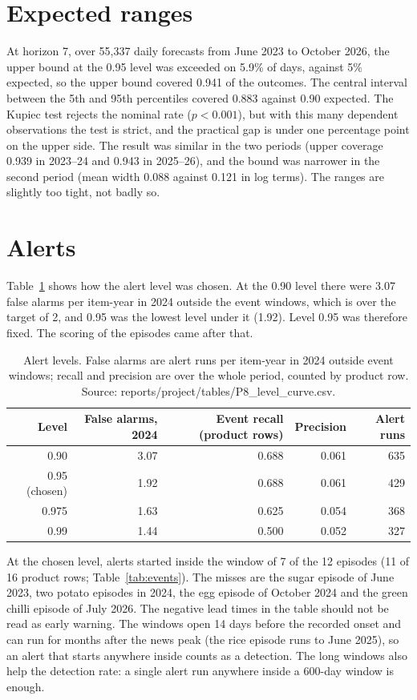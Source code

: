 \documentclass[12pt]{report}
\begin{document}
\section{Expected ranges}
At horizon 7, over 55,337 daily forecasts from June 2023 to October 2026, the upper bound at the 0.95 level was exceeded on 5.9\% of days, against 5\% expected, so the upper bound covered 0.941 of the outcomes. The central interval between the 5th and 95th percentiles covered 0.883 against 0.90 expected. The Kupiec test rejects the nominal rate ($p<0.001$), but with this many dependent observations the test is strict, and the practical gap is under one percentage point on the upper side. The result was similar in the two periods (upper coverage 0.939 in 2023--24 and 0.943 in 2025--26), and the bound was narrower in the second period (mean width 0.088 against 0.121 in log terms). The ranges are slightly too tight, not badly so.

\section{Alerts}
Table~\ref{tab:level} shows how the alert level was chosen. At the 0.90 level there were 3.07 false alarms per item-year in 2024 outside the event windows, which is over the target of 2, and 0.95 was the lowest level under it (1.92). Level 0.95 was therefore fixed. The scoring of the episodes came after that.

\begin{table}[H]\centering\small
\caption{Alert levels. False alarms are alert runs per item-year in 2024 outside event windows; recall and precision are over the whole period, counted by product row. Source: reports/project/tables/P8\_level\_curve.csv.}\label{tab:level}
\begin{tabular}{rrrrr}
\toprule
Level & False alarms, 2024 & Event recall (product rows) & Precision & Alert runs \\
\midrule
0.90 & 3.07 & 0.688 & 0.061 & 635 \\
0.95 (chosen) & 1.92 & 0.688 & 0.061 & 429 \\
0.975 & 1.63 & 0.625 & 0.054 & 368 \\
0.99 & 1.44 & 0.500 & 0.052 & 327 \\
\bottomrule
\end{tabular}
\end{table}

At the chosen level, alerts started inside the window of 7 of the 12 episodes (11 of 16 product rows; Table~\ref{tab:events}). The misses are the sugar episode of June 2023, two potato episodes in 2024, the egg episode of October 2024 and the green chilli episode of July 2026. The negative lead times in the table should not be read as early warning. The windows open 14 days before the recorded onset and can run for months after the news peak (the rice episode runs to June 2025), so an alert that starts anywhere inside counts as a detection. The long windows also help the detection rate: a single alert run anywhere inside a 600-day window is enough.
\end{document}
